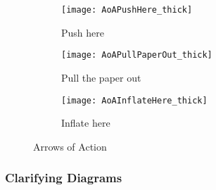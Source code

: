 %
\begin{figure*}[h]
    \centering
    \begin{subfigure}[b]{0.3\textwidth}
        \texttt{[image: AoAPushHere\_thick]}
        \caption{Push here}
        \label{fig:aoaPushHere}
    \end{subfigure}
    \begin{subfigure}[b]{0.3\textwidth}
        \texttt{[image: AoAPullPaperOut\_thick]}
        \caption{Pull the paper out}
        \label{fig:aoaPullPaperOut}
    \end{subfigure}
    \begin{subfigure}[b]{0.3\textwidth}
        \texttt{[image: AoAInflateHere\_thick]}
        \caption{Inflate here}
        \label{fig:aoaInflateHere}
    \end{subfigure}
    \caption{Arrows of Action}
    \label{fig:arrowsOfAction}
\end{figure*}

\newpage

\subsubsection{Clarifying Diagrams}


